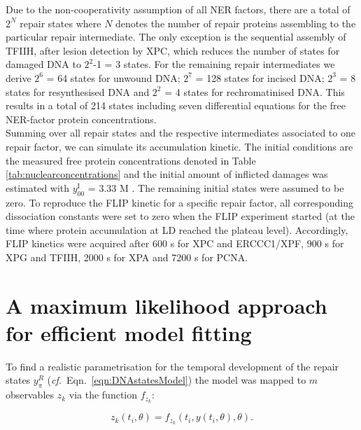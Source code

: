 Due to the non-cooperativity assumption of all NER factors, there are a total of $\text{2}^N$ repair states where $N$ denotes the number of repair proteins assembling to the particular repair intermediate. The only exception is the sequential assembly of TFIIH, after lesion detection by XPC, which reduces the number of states for damaged DNA to $\text{2}^\text{2}$-1 = 3 states. For the remaining repair intermediates we derive  $\text{2}^\text{6}$ = 64 states for unwound DNA;  $\text{2}^\text{7}$ = 128 states for incised DNA; $\text{2}^\text{3}$ = 8 states for resynthesised DNA and $\text{2}^\text{2}$ = 4 states for rechromatinised DNA. This results in a total of 214 states including seven differential equations for the free NER-factor protein concentrations. \\
Summing over all repair states and the respective intermediates associated to one repair factor, we can simulate its accumulation kinetic. The initial conditions are the measured free protein concentrations denoted in Table \ref{tab:nuclearconcentrations}\cite{Terstiege2010,Luijsterburg2010} and the initial amount of inflicted damages was estimated with  $y_{00}^{\text{I}}$ = 3.33 \textmu M \cite{Verbruggen2014}. The remaining initial states were assumed to be zero. To reproduce the FLIP kinetic for a specific repair factor, all corresponding dissociation constants were set to zero when the FLIP experiment started (at the time where protein accumulation at LD reached the plateau level). Accordingly, FLIP kinetics were acquired after 600 s for XPC and ERCCC1/XPF, 900 s for XPG and TFIIH, 2000 s for XPA and 7200 s for PCNA. 


 

\section{A maximum likelihood approach for efficient model fitting}
\label{sec:maximumLL}
To find a realistic parametrisation for the temporal development of the repair states $y_\pi^R$ (\textit{cf.}\ Eqn.\ \ref{eqn:DNAstatesModel}) the model was mapped to $m$ observables $z_k$ via the function $f_{z_k}$:

  \begin{equation}
  	z_k(t_i,\theta) = f_{z_k}(t_i,y(t_i,\theta),\theta).
  	\label{eqn:observable}
  \end{equation} 

